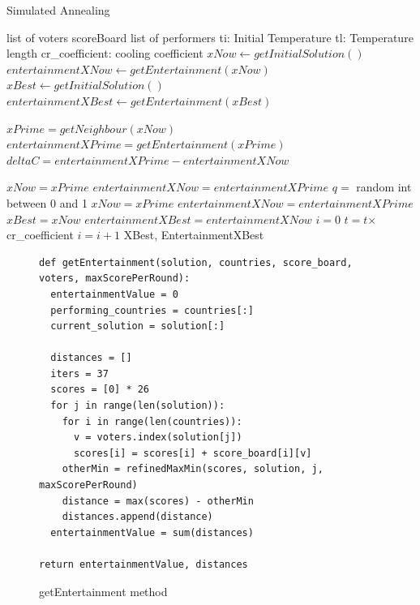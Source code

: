 \documentclass[12pt]{report}
\begin{document}
\begin{algorithm}
\caption{Simulated Annealing}
\label{simAnnealingPseudocode}
\begin{algorithmic}[1]
\REQUIRE list of voters
\REQUIRE scoreBoard
\REQUIRE list of performers
\REQUIRE ti: Initial Temperature
\REQUIRE tl: Temperature length
\REQUIRE cr\_coefficient: cooling coefficient
\STATE $xNow \leftarrow getInitialSolution()$
\STATE $entertainmentXNow \leftarrow getEntertainment(xNow)$
\STATE $xBest \leftarrow getInitialSolution()$
\STATE $entertainmentXBest \leftarrow getEntertainment(xBest)$

\STATE $xPrime = getNeighbour(xNow)$
\STATE $entertainmentXPrime = getEntertainment(xPrime)$
\STATE $deltaC = entertainmentXPrime - entertainmentXNow$

\STATE $xNow = xPrime$
\STATE $entertainmentXNow = entertainmentXPrime$
\ELSE
\STATE$q = $ random int between 0 and 1
\STATE $xNow = xPrime$
\STATE $entertainmentXNow = entertainmentXPrime$
\ENDIF
\ENDIF
{}
\STATE $xBest = xNow$
\STATE $entertainmentXBest = entertainmentXNow$
\STATE $i = 0$
\ENDIF
\ENDFOR
\STATE $t = t $$\times$cr\_coefficient
\STATE $i = i + 1$
\ENDWHILE
\RETURN XBest, EntertainmentXBest
\end{algorithmic}
\end{algorithm}

\begin{figure}[H]
\caption{getEntertainment method}
\label{getEntertainment}
\begin{lstlisting}
def getEntertainment(solution, countries, score_board, voters, maxScorePerRound):
  entertainmentValue = 0
  performing_countries = countries[:]
  current_solution = solution[:]
    
  distances = []
  iters = 37
  scores = [0] * 26
  for j in range(len(solution)):
    for i in range(len(countries)):
      v = voters.index(solution[j])
      scores[i] = scores[i] + score_board[i][v]
    otherMin = refinedMaxMin(scores, solution, j, maxScorePerRound)
    distance = max(scores) - otherMin
    distances.append(distance)
  entertainmentValue = sum(distances)
  
return entertainmentValue, distances
\end{lstlisting}
\end{figure}
\end{document}
